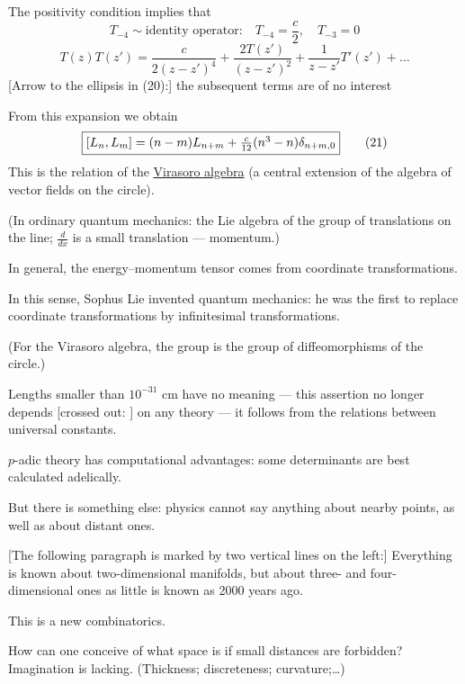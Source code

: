 The positivity condition implies that
\begin{equation*}
T_{-4}\sim\text{identity operator:}\quad T_{-4}=\frac c2,\quad T_{-3}=0
\tag{19}
\end{equation*}
\begin{equation*}
T(z)T(z')=\frac{c}{2(z-z')^4}+\frac{2T(z')}{(z-z')^2}
+\frac{1}{z-z'}T'(z')+\ldots
\tag{20}
\end{equation*}
[Arrow to the ellipsis in (20):] the subsequent terms are of no interest

From this expansion we obtain
\begin{equation*}
\fbox{$[L_n,L_m]=(n-m)L_{n+m}+\frac{c}{12}(n^3-n)\delta_{n+m,0}$}
\tag{21}
\end{equation*}
This is the relation of the \underline{Virasoro algebra} (a central extension of the algebra of vector fields on the circle).

(In ordinary quantum mechanics: the Lie algebra of the group of translations on the line;
$\frac{d}{dx}$ is a small translation --- momentum.)

In general, the energy--momentum tensor comes from coordinate transformations.

In this sense, Sophus Lie invented quantum mechanics: he was the first to replace coordinate transformations by infinitesimal transformations.

(For the Virasoro algebra, the group is the group of diffeomorphisms of the circle.)

Lengths smaller than $10^{-31}$ cm have no meaning --- this assertion no longer depends
[crossed out: ]
on any theory --- it follows from the relations between universal constants.

$p$-adic theory has computational advantages: some determinants are best calculated adelically.

But there is something else: physics cannot say anything about nearby points, as well as about distant ones.

[The following paragraph is marked by two vertical lines on the left:]
Everything is known about two-dimensional manifolds, but about three- and four-dimensional ones as little is known as 2000 years ago.

This is a new combinatorics.

How can one conceive of what space is if small distances are forbidden? Imagination is lacking.
(Thickness; discreteness; curvature;\ldots)

